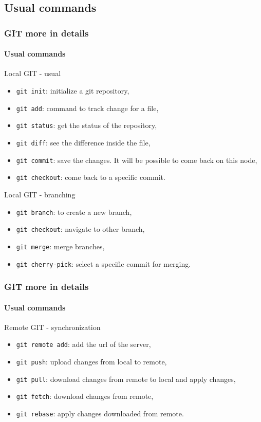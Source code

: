 \documentclass{beamer}
\begin{document}
\subsection{Usual commands}

\begin{frame}
  \frametitle{GIT more in details}
  \framesubtitle{Usual commands}
  \begin{block}{\footnotesize Local GIT - usual}\footnotesize
    \begin{itemize}
    \item \texttt{git init}: initialize a git repository,
    \item \texttt{git add}: command to track change for a file,
    \item \texttt{git status}: get the status of the repository,
    \item \texttt{git diff}: see the difference inside the file,
    \item \texttt{git commit}: save the changes. It will be possible to come back on this node,
    \item \texttt{git checkout}: come back to a specific commit. 
    \end{itemize}
  \end{block}
  \begin{block}{\footnotesize Local GIT - branching}\footnotesize
    \begin{itemize}
    \item \texttt{git branch}: to create a new branch,
    \item \texttt{git checkout}: navigate to other branch,
    \item \texttt{git merge}: merge branches,
    \item \texttt{git cherry-pick}: select a specific commit for merging.
    \end{itemize}
  \end{block}
\end{frame}

\begin{frame}
  \frametitle{GIT more in details}
  \framesubtitle{Usual commands}
  \begin{block}{Remote GIT - synchronization}\footnotesize
    \begin{itemize}
    \item \texttt{git remote add}: add the url of the server,  
    \item \texttt{git push}: upload changes from local to remote,
    \item \texttt{git pull}: download changes from remote to local and apply changes,
    \item \texttt{git fetch}: download changes from remote,
    \item \texttt{git rebase}: apply changes downloaded from remote.
    \end{itemize}
  \end{block}
\end{frame}
\end{document}
